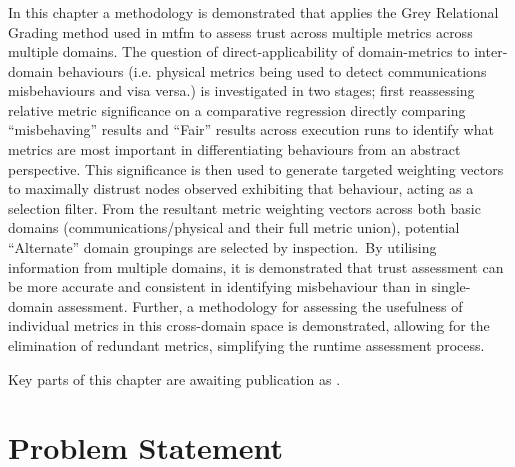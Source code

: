 
\subsubsection{}

In this chapter a methodology is demonstrated that applies the Grey Relational Grading method used in \gls{mtfm} to assess trust across multiple metrics across multiple domains.
The question of direct-applicability of domain-metrics to inter-domain behaviours (i.e. physical metrics being used to detect communications misbehaviours and visa versa.) is investigated in two stages; first reassessing relative metric significance on a comparative regression directly comparing ``misbehaving'' results and ``Fair'' results across execution runs to identify what metrics are most important in  differentiating behaviours from an abstract perspective. 
This significance is then used to generate targeted weighting vectors to maximally distrust nodes observed exhibiting that behaviour, acting as a selection filter.
From the resultant metric weighting vectors across both basic domains (communications/physical and their full metric union), potential ``Alternate'' domain groupings are selected by inspection.\
By utilising information from multiple domains, it is demonstrated that trust assessment can be more accurate and consistent in identifying misbehaviour than in single-domain assessment.
Further, a methodology for assessing the usefulness of individual metrics in this cross-domain space is demonstrated, allowing for the elimination of redundant metrics, simplifying the runtime assessment process.

{\sloppy \raggedright
Key parts of this chapter are awaiting publication as  .
}


\section{Problem Statement}

